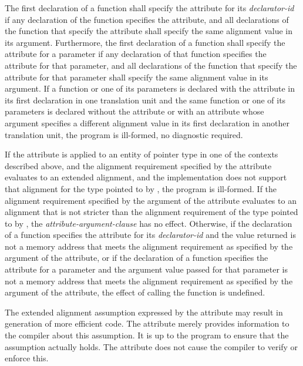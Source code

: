\begin{addedblock}
\pnum
The first declaration of a function shall specify the  attribute for its \textit{declarator-id} if any declaration of the function specifies the  attribute, and all declarations of the function that specify the  attribute shall specify the same alignment value in its argument. Furthermore, the first declaration of a function shall specify the  attribute for a parameter if any declaration of that function specifies the  attribute for that parameter, and all declarations of the function that specify the  attribute for that parameter shall specify the same alignment value in its argument. If a function or one of its parameters is declared with the  attribute in its first declaration in one translation unit and the same function or one of its parameters is declared without the  attribute or with an  attribute whose argument specifies a different alignment value in its first declaration in another translation unit, the program is ill-formed, no diagnostic required.

\pnum
If the  attribute is applied to an entity of pointer type  in one of the contexts described above, and the alignment requirement specified by the attribute evaluates to an extended alignment, and the implementation does not support that alignment for the type pointed to by , the program is ill-formed. If the alignment requirement specified by the argument of the  attribute evaluates to an alignment that is not stricter than the alignment requirement of the type pointed to by , the \textit{attribute-argument-clause} has no effect. Otherwise, if the declaration of a function specifies the  attribute for its \textit{declarator-id} and the value returned is not a memory address that meets the alignment requirement as specified by the argument of the attribute, or if the declaration of a function specifies the  attribute for a parameter and the argument value passed for that parameter is not a memory address that meets the alignment requirement as specified by the argument of the attribute, the effect of calling the function is undefined.

\begin{note}
The extended alignment assumption expressed by the  attribute may result in generation of more efficient code. The attribute merely provides information to the compiler about this assumption. It is up to the program to ensure that the assumption actually holds. The attribute does not cause the compiler to verify or enforce this.
\end{note}


\end{addedblock}
